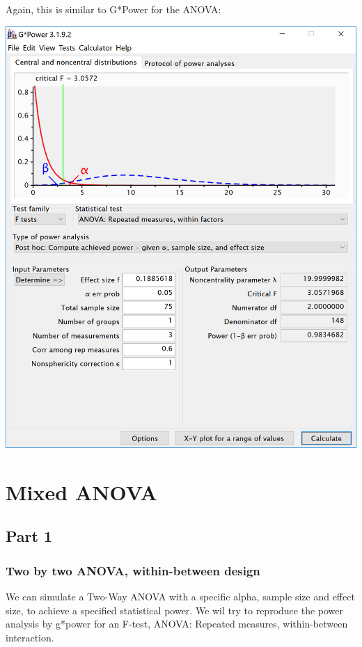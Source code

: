 \documentclass[]{book}
\begin{document}
Again, this is similar to G*Power for the ANOVA:

\includegraphics{screenshots/gpower_4.png}

\hypertarget{mixed-anova}{%
\chapter{Mixed ANOVA}\label{mixed-anova}}

\hypertarget{part-1-2}{%
\section{Part 1}\label{part-1-2}}

\hypertarget{two-by-two-anova-within-between-design}{%
\subsection{Two by two ANOVA, within-between design}\label{two-by-two-anova-within-between-design}}

We can simulate a Two-Way ANOVA with a specific alpha, sample size and effect size, to achieve a specified statistical power. We wil try to reproduce the power analysis by g*power for an F-test, ANOVA: Repeated measures, within-between interaction.
\end{document}
